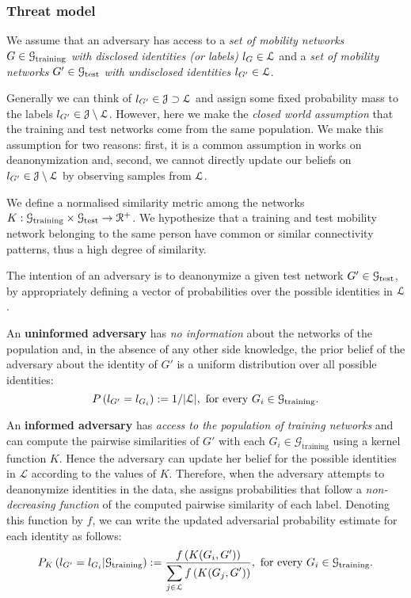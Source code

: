 \subsubsection{Threat model \label{sec:threat-model}}

We assume that an adversary has access to a \emph{set of mobility networks} $ G \in \mathcal{G}_{\text{training}} $ \emph{with disclosed identities (or labels)} $l_{G} \in \mathcal{L}$
and a \emph{set of mobility networks} $ G' \in \mathcal{G}_{\text{test}} $ \emph{with undisclosed identities}
$ l_{G'} \in \mathcal{L}$.%

{Generally we can think of $ l_{G'} \in \mathcal{J} \supset \mathcal{L}$ and assign some fixed probability mass to the labels $ l_{G'} \in \mathcal{J} \setminus \mathcal{L}$.
However, here we make the \emph{closed world assumption} that the training and test networks come from the same population.
We make this assumption for two reasons: first, it is a common assumption in works on deanonymization and, second, we cannot directly update our beliefs on $ l_{G'} \in \mathcal{J} \setminus \mathcal{L}$ by observing samples from $ \mathcal{L}$. }

We define a normalised similarity metric among the networks $ K: \mathcal{G}_{\text{training}} \times \mathcal{G}_{\text{test}} \rightarrow \mathcal{R}^+ $.
We hypothesize that a training and test mobility network belonging to the same person have common or similar connectivity patterns, thus a high degree of similarity.

The intention of an adversary is to deanonymize a given test network $ G' \in \mathcal{G}_{\text{test}} $, by appropriately defining a vector of probabilities over the possible identities in $ \mathcal{L}$.

An \textbf{uninformed adversary} has \emph{no information} about the networks of the population and, in the absence of any other side knowledge, the prior belief of the adversary about the identity of $ G' $ is a uniform distribution over all possible identities:
\[
	P\left(l_{G'}= l_{G_i}\right) := 1/|\mathcal{L}|, \mbox{ for every }  G_i \in \mathcal{G}_{\text{training}}.
\]

An \textbf{informed adversary} has \emph{access to the population of training networks} and can compute the pairwise similarities of $ G' $ with each $ G_{i} \in \mathcal{G}_{\text{training}} $ using a kernel function $K$. Hence the adversary can update her belief for the possible identities in $ \mathcal{L} $ according to the values of $K$.
Therefore, when the adversary attempts to deanonymize identities in the data, she assigns probabilities that follow a \emph{non-decreasing function} {of the computed pairwise similarity} of each label.
Denoting this function by $f$, we can write the updated adversarial probability estimate for each identity as follows:
\[
	P_K\left(l_{G'} =l_{G_i}| \mathcal{G}_{\text{training}}\right) :=  \frac{f\left(K(G_i, G')\right)}{\displaystyle \sum_{j\in \mathcal{L}}  f\left(K(G_j, G')\right)},   \mbox{ for every }  G_i \in \mathcal{G}_{\text{training}}.
	\label{eq:adversarial_rule}
\]




